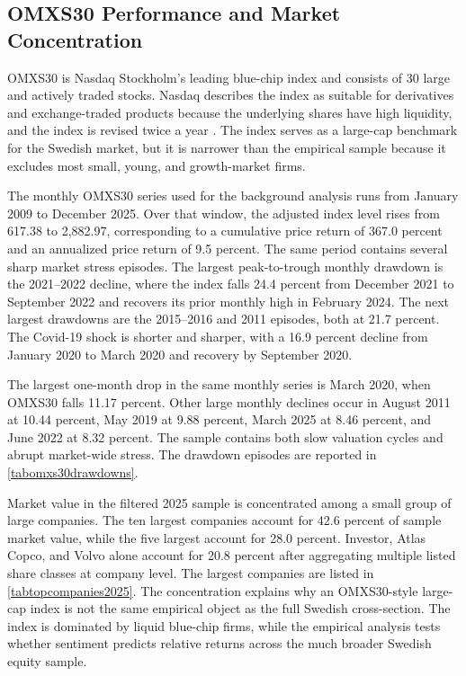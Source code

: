 \documentclass[11pt]{article}
\begin{document}
\subsection{OMXS30 Performance and Market Concentration}
OMXS30 is Nasdaq Stockholm's leading blue-chip index and consists of 30 large and actively traded stocks. Nasdaq describes the index as suitable for derivatives and exchange-traded products because the underlying shares have high liquidity, and the index is revised twice a year \citep{nasdaq2026omxs30overview}. The index serves as a large-cap benchmark for the Swedish market, but it is narrower than the empirical sample because it excludes most small, young, and growth-market firms.

The monthly OMXS30 series used for the background analysis runs from January 2009 to December 2025. Over that window, the adjusted index level rises from 617.38 to 2,882.97, corresponding to a cumulative price return of 367.0 percent and an annualized price return of 9.5 percent. The same period contains several sharp market stress episodes. The largest peak-to-trough monthly drawdown is the 2021--2022 decline, where the index falls 24.4 percent from December 2021 to September 2022 and recovers its prior monthly high in February 2024. The next largest drawdowns are the 2015--2016 and 2011 episodes, both at 21.7 percent. The Covid-19 shock is shorter and sharper, with a 16.9 percent decline from January 2020 to March 2020 and recovery by September 2020.


The largest one-month drop in the same monthly series is March 2020, when OMXS30 falls 11.17 percent. Other large monthly declines occur in August 2011 at 10.44 percent, May 2019 at 9.88 percent, March 2025 at 8.46 percent, and June 2022 at 8.32 percent. The sample contains both slow valuation cycles and abrupt market-wide stress. The drawdown episodes are reported in \cref{tabomxs30drawdowns}.

Market value in the filtered 2025 sample is concentrated among a small group of large companies. The ten largest companies account for 42.6 percent of sample market value, while the five largest account for 28.0 percent. Investor, Atlas Copco, and Volvo alone account for 20.8 percent after aggregating multiple listed share classes at company level. The largest companies are listed in \cref{tabtopcompanies2025}. The concentration explains why an OMXS30-style large-cap index is not the same empirical object as the full Swedish cross-section. The index is dominated by liquid blue-chip firms, while the empirical analysis tests whether sentiment predicts relative returns across the much broader Swedish equity sample.
\end{document}

